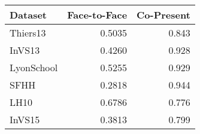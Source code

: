\begin{tabular}{lrr}
\hline
 Dataset    &   Face-to-Face &   Co-Present \\
\hline
 Thiers13   &         0.5035 &        0.843 \\
 InVS13     &         0.4260 &        0.928 \\
 LyonSchool &         0.5255 &        0.929 \\
 SFHH       &         0.2818 &        0.944 \\
 LH10       &         0.6786 &        0.776 \\
 InVS15     &         0.3813 &        0.799 \\
\hline
\end{tabular}
